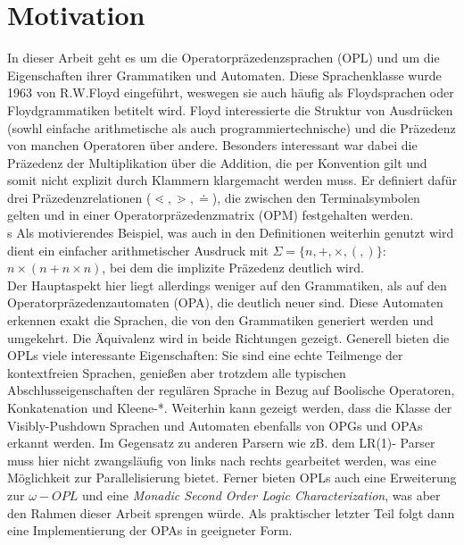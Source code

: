 \section{Motivation}
In dieser Arbeit geht es um die Operatorpräzedenzsprachen (OPL) und um die Eigenschaften ihrer Grammatiken und Automaten. Diese Sprachenklasse wurde 1963 von R.W.Floyd eingeführt, weswegen sie auch häufig als Floydsprachen oder Floydgrammatiken betitelt wird. Floyd interessierte die Struktur von Ausdrücken (sowhl einfache arithmetische als auch programmiertechnische) und die Präzedenz von manchen Operatoren über andere. Besonders interessant war dabei die Präzedenz der Multiplikation über die Addition, die per Konvention gilt und somit nicht explizit durch Klammern klargemacht werden muss. Er definiert dafür drei Präzedenzrelationen ($\lessdot, \gtrdot, \doteq$), die zwischen den Terminalsymbolen gelten und in einer Operatorpräzedenzmatrix (OPM) festgehalten werden.\\s
Als motivierendes Beispiel, was auch in den Definitionen weiterhin genutzt wird dient ein einfacher arithmetischer Ausdruck mit $\Sigma = \{n, +, \times, (, )\}$:\\ $ n \times (n + n \times n)$, bei dem die implizite Präzedenz deutlich wird.\\
Der Hauptaspekt hier liegt allerdings weniger auf den Grammatiken, als auf den Operatorpräzedenzautomaten (OPA), die deutlich neuer sind. Diese Automaten erkennen exakt die Sprachen, die von den Grammatiken generiert werden und umgekehrt. Die Äquivalenz wird in beide Richtungen gezeigt.
Generell bieten die OPLs viele interessante Eigenschaften: Sie sind eine echte Teilmenge der kontextfreien Sprachen, genießen aber trotzdem alle typischen Abschlusseigenschaften der regulären Sprache in Bezug auf Boolische Operatoren, Konkatenation und Kleene-*. 
Weiterhin kann gezeigt werden, dass die Klasse der Visibly-Pushdown Sprachen und Automaten ebenfalls von OPGs und OPAs erkannt werden. Im Gegensatz zu anderen Parsern wie zB. dem LR(1)- Parser muss hier nicht zwangsläufig von links nach rechts gearbeitet werden, was eine Möglichkeit zur Parallelisierung bietet. Ferner bieten OPLs auch eine Erweiterung zur $\omega- OPL$ und eine \textit{Monadic Second Order Logic Characterization}, was aber den Rahmen dieser Arbeit sprengen würde.
Als praktischer letzter Teil folgt dann eine Implementierung der OPAs in geeigneter Form.